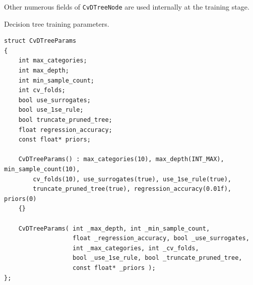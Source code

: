 
Other numerous fields of \texttt{CvDTreeNode} are used internally at the training stage.


Decision tree training parameters.

\begin{lstlisting}
struct CvDTreeParams
{
    int max_categories;
    int max_depth;
    int min_sample_count;
    int cv_folds;
    bool use_surrogates;
    bool use_1se_rule;
    bool truncate_pruned_tree;
    float regression_accuracy;
    const float* priors;

    CvDTreeParams() : max_categories(10), max_depth(INT_MAX), min_sample_count(10),
        cv_folds(10), use_surrogates(true), use_1se_rule(true),
        truncate_pruned_tree(true), regression_accuracy(0.01f), priors(0)
    {}

    CvDTreeParams( int _max_depth, int _min_sample_count,
                   float _regression_accuracy, bool _use_surrogates,
                   int _max_categories, int _cv_folds,
                   bool _use_1se_rule, bool _truncate_pruned_tree,
                   const float* _priors );
};
\end{lstlisting}

